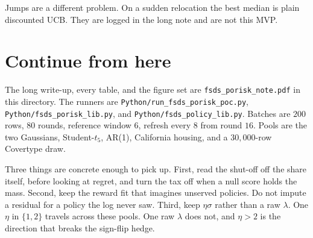 \documentclass[11pt]{article}
\begin{document}
Jumps are a different problem. On a sudden relocation the best median is plain
discounted UCB. They are logged in the long note and are not this MVP.

\section{Continue from here}

The long write-up, every table, and the figure set are
\texttt{fsds\_porisk\_note.pdf} in this directory.
The runners are \texttt{Python/run\_fsds\_porisk\_poc.py},
\texttt{Python/fsds\_porisk\_lib.py}, and \texttt{Python/fsds\_policy\_lib.py}.
Batches are \(200\) rows, \(80\) rounds, reference window \(6\), refresh every
\(8\) from round \(16\). Pools are the two Gaussians, Student-\(t_5\), AR(1),
California housing, and a \(30{,}000\)-row Covertype draw.

Three things are concrete enough to pick up.
First, read the shut-off off the share itself, before looking at regret, and
turn the tax off when a null score holds the mass.
Second, keep the reward fit that imagines unserved policies. Do not impute a
residual for a policy the log never saw.
Third, keep \(\eta\sigma\) rather than a raw \(\lambda\). One \(\eta\) in
\(\{1,2\}\) travels across these pools. One raw \(\lambda\) does not, and
\(\eta>2\) is the direction that breaks the sign-flip hedge.
\end{document}
